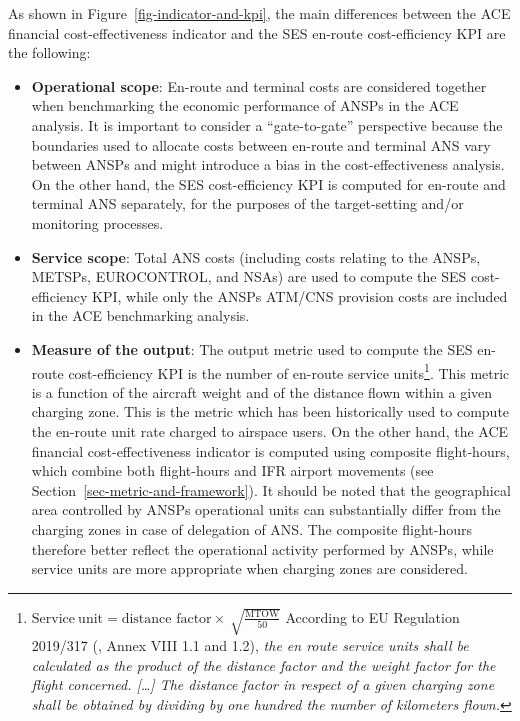 \documentclass[
  11pt,
  a4paperpaper,
  openany,headsepline=on,footsepline=off,DIV=12,table]{scrbook}
\begin{document}
As shown in Figure~\ref{fig-indicator-and-kpi}, the main differences
between the ACE financial cost-effectiveness indicator and the SES
en-route cost-efficiency KPI are the following:

\begin{itemize}
\item
  \textbf{Operational scope}: En-route and terminal costs are considered
  together when benchmarking the economic performance of ANSPs in the
  ACE analysis. It is important to consider a ``gate-to-gate''
  perspective because the boundaries used to allocate costs between
  en-route and terminal ANS vary between ANSPs and might introduce a
  bias in the cost-effectiveness analysis. On the other hand, the SES
  cost-efficiency KPI is computed for en-route and terminal ANS
  separately, for the purposes of the target-setting and/or monitoring
  processes.
\item
  \textbf{Service scope}: Total ANS costs (including costs relating to
  the ANSPs, METSPs, EUROCONTROL, and NSAs) are used to compute the SES
  cost-efficiency KPI, while only the ANSPs ATM/CNS provision costs are
  included in the ACE benchmarking analysis.
\item
  \textbf{Measure of the output}: The output metric used to compute the
  SES en-route cost-efficiency KPI is the number of en-route service
  units\footnote{\(\text{Service}\ \text{unit} = \text{distance factor} \times \ \sqrt{\frac{\text{MTOW}}{50}}\)
    According to EU Regulation 2019/317
    (, Annex VIII
    1.1 and 1.2), \emph{the en route service units shall be calculated
    as the product of the distance factor and the weight factor for the
    flight concerned. {[}\ldots{]} The distance factor in respect of a
    given charging zone shall be obtained by dividing by one hundred the
    number of kilometers flown.}}. This metric is a function of the
  aircraft weight and of the distance flown within a given charging
  zone. This is the metric which has been historically used to compute
  the en-route unit rate charged to airspace users. On the other hand,
  the ACE financial cost-effectiveness indicator is computed using
  composite flight-hours, which combine both flight-hours and IFR
  airport movements (see Section~\ref{sec-metric-and-framework}). It
  should be noted that the geographical area controlled by ANSPs
  operational units can substantially differ from the charging zones in
  case of delegation of ANS. The composite flight-hours therefore better
  reflect the operational activity performed by ANSPs, while service
  units are more appropriate when charging zones are considered.
\end{itemize}
\end{document}
